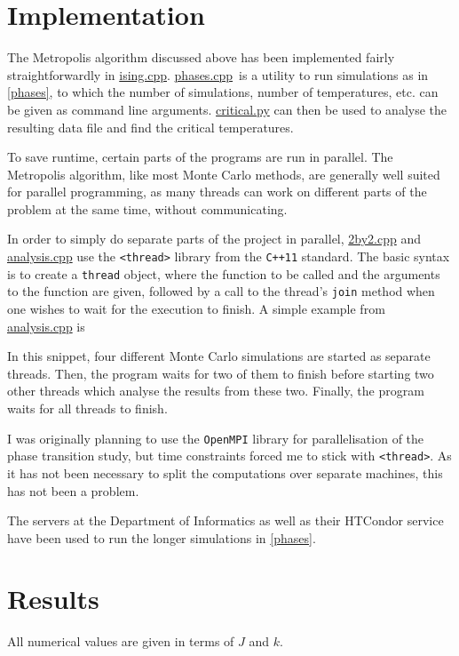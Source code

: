 \documentclass[12pt,english,a4paper]{article}
\newcommand{\program}[1]{\href{https://github.com/anjohan/Offentlig/blob/master/FYS3150/Oblig4/#1}{#1}}
\begin{document}
\section{Implementation}
The Metropolis algorithm discussed above has been implemented fairly straightforwardly in \program{ising.cpp}. \program{phases.cpp} is a utility to run simulations as in \ref{phases}, to which the number of simulations, number of temperatures, etc. can be given as command line arguments. \program{critical.py} can then be used to analyse the resulting data file and find the critical temperatures.

To save runtime, certain parts of the programs are run in parallel. The Metropolis algorithm, like most Monte Carlo methods, are generally well suited for parallel programming, as many threads can work on different parts of the problem at the same time, without communicating.

In order to simply do separate parts of the project in parallel, \program{2by2.cpp} and \program{analysis.cpp} use the \texttt{<thread>} library from the \texttt{C++11} standard. The basic syntax is to create a \texttt{thread} object, where the function to be called and the arguments to the function are given, followed by a call to the thread's \texttt{join} method when one wishes to wait for the execution to finish. A simple example from \program{analysis.cpp} is

In this snippet, four different Monte Carlo simulations are started as separate threads. Then, the program waits for two of them to finish before starting two other threads which analyse the results from these two. Finally, the program waits for all threads to finish.

I was originally planning to use the \texttt{OpenMPI} library for parallelisation of the phase transition study, but time constraints forced me to stick with \texttt{<thread>}. As it has not been necessary to split the computations over separate machines, this has not been a problem.

The servers at the Department of Informatics as well as their HTCondor service have been used to run the longer simulations in \ref{phases}.

\section{Results}
All numerical values are given in terms of \(J\) and \(k\).
\end{document}
